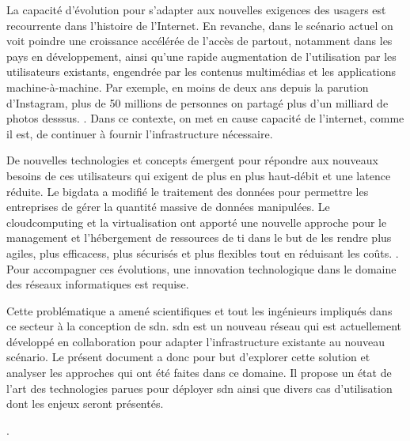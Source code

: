 \par
La capacité d'évolution pour s'adapter aux nouvelles exigences des usagers est recourrente dans l'histoire de l'Internet. \cite{InternetSustainGrowth}
En revanche, dans le scénario actuel on voit poindre une croissance accélérée de l'accès de partout, notamment dans les pays en développement, ainsi qu'une rapide augmentation de l'utilisation par les utilisateurs existants, engendrée par les contenus multimédias et les applications machine-à-machine. Par exemple, en moins de deux ans depuis la parution d'Instagram, plus de 50 millions de personnes on partagé plus d'un milliard de photos desssus. \cite{deuxAnsInstagram}.
Dans ce contexte, on met en cause capacité de l'internet, comme il est, de continuer à fournir l'infrastructure nécessaire.
\par
De nouvelles technologies et concepts émergent pour répondre aux nouveaux besoins de ces utilisateurs qui exigent de plus en plus haut-débit et une latence réduite. Le \gls{bigdata} a modifié le traitement des données pour permettre les entreprises de gérer la quantité massive de données manipulées. \cite{IMBigData} Le \gls{cloudcomputing} et la \gls{virtualisation} ont apporté une nouvelle approche pour le management et l'hébergement de ressources de \gls{ti} dans le but de les rendre plus agiles, plus efficacess, plus sécurisés et plus flexibles tout en réduisant les coûts. \cite{CloudComputingIntelVision}. Pour accompagner ces évolutions, une innovation technologique dans le domaine des réseaux informatiques est requise. \cite{InternetEvolutionRoleSoftwareEngineering}
\par
Cette problématique a amené scientifiques et tout les ingénieurs impliqués dans ce secteur à la conception de \gls{sdn}. \gls{sdn} est un nouveau  réseau qui est actuellement développé en collaboration pour adapter l'infrastructure existante au nouveau scénario.\cite{OpenFlowStanford} Le présent document a donc pour but d'explorer cette solution et analyser les approches qui ont été faites dans ce domaine. Il propose un état de l'art des technologies parues pour déployer \gls{sdn} ainsi que divers cas d'utilisation dont les enjeux seront présentés.
\par
[un paragraphe pour le plan du texte (de quoi parle chaque section)]
\par
[Un paragraphe pour conclure l'intro et laisser les pistes de mon point de vue et les conclusions trouvées].


